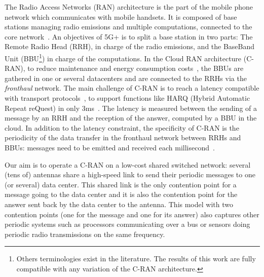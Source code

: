 \documentclass[a4paper,UKenglish,cleveref, autoref, thm-restate]{lipics-v2019}
\begin{document}
The Radio Access Networks (RAN) architecture is the part of the mobile phone network which communicates with mobile handsets. It is composed of base stations managing radio emissions and multiple computations, connected to the core network~\cite{bouguen2012lte}.
An objectives of 5G+ is to split a base station in two parts: The Remote Radio Head (RRH), in charge of the radio emissions, and the BaseBand Unit (BBU\footnote{Others terminologies exist in the literature. The results of this work are fully compatible with any variation of the C-RAN architecture.}) in charge of the computations. In the Cloud RAN architecture
(C-RAN), to reduce maintenance and energy consumption costs~\cite{gavrilovska2020cloud,mobile2011c,checko2014cloud}, the BBUs are gathered in one or several datacenters and are connected to the RRHs via the \emph{fronthaul} network.
 The main challenge of C-RAN is to reach a latency compatible with transport protocols~\cite{ieeep802}, to support functions like  HARQ (Hybrid Automatic Repeat reQuest) in only $3$ms~\cite{bouguen2012lte}. The latency is measured between the sending of a message by an RRH and the reception of the answer, computed by a BBU in the cloud.
  In addition to the latency constraint, the specificity of C-RAN is the periodicity of the data transfer in the fronthaul network between RRHs and BBUs: messages need to be emitted and received each millisecond~\cite{dogra2020survey,3gpp5g,romano2019imt}.

Our aim is to operate a C-RAN on a low-cost shared switched network: several (tens of) antennas share a high-speed link to send their periodic messages to one (or several) data center. This shared link is the only contention point for a message going to the data center and it is also the contention point for the answer sent back by the data center to the antenna. This model with two contention points (one for the message and one for its answer) also captures other periodic systems such as processors communicating over a bus or sensors doing periodic radio transmissions on the same frequency.
\end{document}
